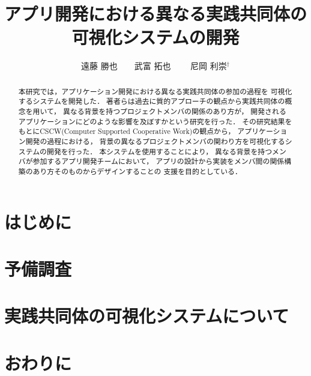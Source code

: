 \documentclass[twoside]{wiss}
\begin{document}
\title{アプリ開発における異なる実践共同体の可視化システムの開発}
\etitle{}%
%
%
%
\author{遠藤 勝也　　武富 拓也
　　尼岡 利崇${}^\dag$}

\begin{abstract}
本研究では，アプリケーション開発における異なる実践共同体の参加の過程を
可視化するシステムを開発した．
著者らは過去に質的アプローチの観点から実践共同体の概念を用いて，
異なる背景を持つプロジェクトメンバの関係のあり方が，
開発されるアプリケーションにどのような影響を及ぼすかという研究を行った．
その研究結果をもとにCSCW(Computer Supported Cooperative Work)の観点から，
アプリケーション開発の過程における，
背景の異なるプロジェクトメンバの関わり方を可視化するシステムの開発を行った．
本システムを使用することにより，
異なる背景を持つメンバが参加するアプリ開発チームにおいて，
アプリの設計から実装をメンバ間の関係構築のあり方そのものからデザインすることの
支援を目的としている．
\end{abstract}

\maketitle

\section{はじめに}
\label{introduction}


\section{予備調査}
\label{preResearch}


\section{実践共同体の可視化システムについて}
\label{system}


\section{おわりに}
\label{conclusion}



\end{document}
